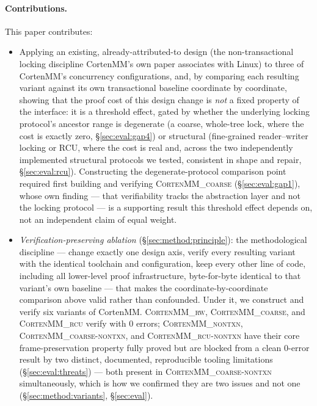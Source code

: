 \documentclass[10pt]{article}
\newcommand{\corten}[1]{\textsc{CortenMM\_#1}}
\begin{document}
\paragraph{Contributions.} This paper contributes:
\begin{itemize}
  \item Applying an existing, already-attributed-to design (the
    non-transactional locking discipline CortenMM's own paper
    associates with Linux) to three of CortenMM's concurrency
    configurations, and, by comparing each resulting variant against
    its own transactional baseline coordinate by coordinate, showing
    that the proof cost of this design change is \emph{not} a fixed
    property of the interface: it is a threshold effect, gated by
    whether the underlying locking protocol's ancestor range is
    degenerate (a coarse, whole-tree lock, where the cost is exactly
    zero, \S\ref{sec:eval:gap4}) or structural (fine-grained
    reader--writer locking or RCU, where the cost is real and, across
    the two independently implemented structural protocols we tested,
    consistent in shape and repair, \S\ref{sec:eval:rcu}). Constructing
    the degenerate-protocol comparison point required first building
    and verifying \corten{coarse} (\S\ref{sec:eval:gap1}), whose own
    finding --- that verifiability tracks the abstraction layer and not
    the locking protocol --- is a supporting result this threshold
    effect depends on, not an independent claim of equal weight.
  \item \emph{Verification-preserving ablation}
    (\S\ref{sec:method:principle}): the methodological discipline ---
    change exactly one design axis, verify every resulting variant
    with the identical toolchain and configuration, keep every other
    line of code, including all lower-level proof infrastructure,
    byte-for-byte identical to that variant's own baseline --- that
    makes the coordinate-by-coordinate comparison above valid rather
    than confounded. Under it, we construct and verify six variants of
    CortenMM. \corten{rw}, \corten{coarse}, and \corten{rcu} verify with
    0 errors; \corten{nontxn}, \corten{coarse-nontxn}, and
    \corten{rcu-nontxn} have their core frame-preservation property
    fully proved but are blocked from a clean 0-error result by two
    distinct, documented, reproducible tooling limitations
    (\S\ref{sec:eval:threats}) --- both present in \corten{coarse-nontxn}
    simultaneously, which is how we confirmed they are two issues and
    not one (\S\ref{sec:method:variants}, \S\ref{sec:eval}).

\end{itemize}
\end{document}
